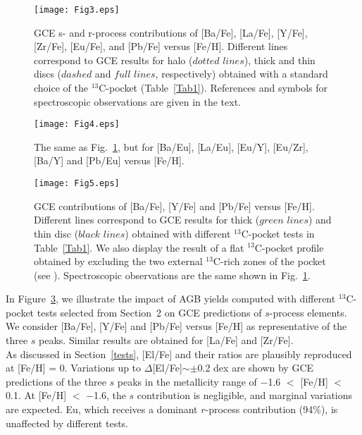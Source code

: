 \documentclass[manuscript]{aastex}
\begin{document}
 
\begin{figure} 
\vspace{-30mm}
\texttt{[image: Fig3.eps]}
\vspace{-25mm}
\caption{\label{Fig3} 
GCE s- and r-process contributions of [Ba/Fe], [La/Fe], [Y/Fe], [Zr/Fe], [Eu/Fe], 
and [Pb/Fe] versus [Fe/H]. 
Different lines correspond to GCE results for halo ($dotted$ $lines$), 
thick and thin discs ($dashed$ and $full$ $lines$, respectively)
obtained with a standard choice of the $^{13}$C-pocket (Table~\ref{Tab1}).
References and symbols for spectroscopic observations are given in the text.}
\end{figure}

 \begin{figure} 
 \vspace{-40mm}
\texttt{[image: Fig4.eps]}
\vspace{-25mm}
\caption{\label{Fig4} The same as Fig.~\ref{Fig3}, but for [Ba/Eu], [La/Eu], 
[Eu/Y], [Eu/Zr], [Ba/Y] and [Pb/Eu] versus [Fe/H]. }
\end{figure}


\begin{figure} 
\vspace{-10mm}
\texttt{[image: Fig5.eps]}  
\vspace{-50mm}
\caption{\label{Fig5} GCE contributions of [Ba/Fe], [Y/Fe] and [Pb/Fe] 
versus [Fe/H]. Different lines correspond to GCE results for thick ($green$ $lines$)
and thin disc ($black$ $lines$) obtained with different $^{13}$C-pocket tests in 
Table~\ref{Tab1}. We also display the result of a flat $^{13}$C-pocket
profile obtained by excluding the two external $^{13}$C-rich zones of the pocket
(see \citealt{bisterzo14}).
Spectroscopic observations are the same shown in Fig.~\ref{Fig3}. } 
\end{figure}

In Figure~\ref{Fig5}, we illustrate the impact of AGB yields 
computed with different $^{13}$C-pocket tests selected from Section~2 
on GCE predictions of $s$-process
elements. We consider [Ba/Fe], [Y/Fe] and [Pb/Fe] versus [Fe/H]
as representative of the three $s$ peaks. Similar results are obtained 
for [La/Fe] and [Zr/Fe].
\\
As discussed in Section~\ref{tests}, [El/Fe] and their ratios are plausibly reproduced 
at [Fe/H] = 0. Variations up to $\Delta$[El/Fe]$\sim$$\pm$0.2 dex
are shown by GCE predictions of the three $s$ peaks in the metallicity range 
of $-$1.6 $<$ [Fe/H] $<$ 0.1. At [Fe/H] $<$ $-$1.6, the $s$ contribution is negligible, 
and marginal variations are expected.
Eu, which receives a dominant $r$-process contribution (94\%), is unaffected by  
different tests. 
\end{document}
